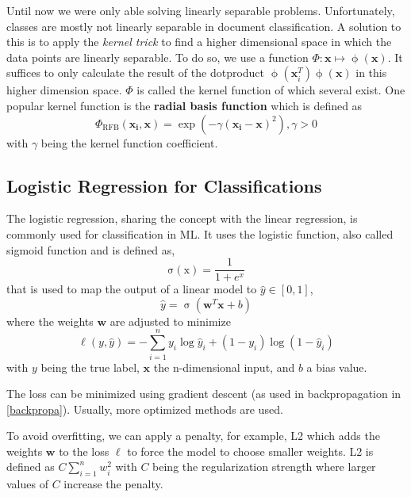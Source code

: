  Until now we were only able solving linearly separable problems.
  Unfortunately, classes are mostly not linearly separable in document classification.
  A solution to this is to apply the \emph{kernel trick} to find a higher dimensional space in which the data points are linearly separable.
  To do so, we use a function $\Phi:\mathbf{x} \mapsto \operatorname{\phi}(\mathbf{x})$. It suffices to only calculate the result of the dotproduct $\operatorname{\phi}(\mathbf{x}^{T}_{i}) \operatorname{\phi}(\mathbf{x})$ in this higher dimension space.
  $\Phi$ is called the kernel function of which several exist.
  One popular kernel function is the \textbf{radial basis function} which is defined as \[\Phi_{\operatorname{RFB}}(\mathbf{x_i},\mathbf{x})= \operatorname{exp}(-\gamma (\mathbf{x_i} - \mathbf{x})^2), \gamma > 0 \]
  with $\gamma$ being the kernel function coefficient.

\subsection{Logistic Regression for Classifications}
  The logistic regression, sharing the concept with the linear regression, is commonly used for classification in ML.
  It uses the logistic function, also called sigmoid function and is defined as, \[\operatorname{\sigma(x)} = \frac{1}{1+e^x}\]
  that is used to map the output of a linear model to $\hat{y} \in [0,1]$,
  \[\hat{y} = \operatorname{\sigma}(\mathbf{w}^T\mathbf{x} +b)\]
  where the weights $\mathbf{w}$ are adjusted to minimize
  \[\operatorname{\ell}(y, \hat{y}) = - \sum_{i=1}^{n} y_i \log \hat{y}_i + (1-y_i) \log(1-\hat{y}_i)\]
  with $y$ being the true label, $\mathbf{x}$ the n-dimensional input, and $b$ a bias value.

  The loss can be minimized using gradient descent (as used in backpropagation in \ref{backpropa}). Usually, more optimized methods are used.

  To avoid overfitting, we can apply a penalty, for example, L2 which adds the weights $\mathbf{w}$ to the loss $\ell$ to force the model to choose smaller weights.
  L2 is defined as $C \sum_{i=1}^n w_i^2$ with $C$ being the regularization strength where larger values of $C$ increase the penalty.

